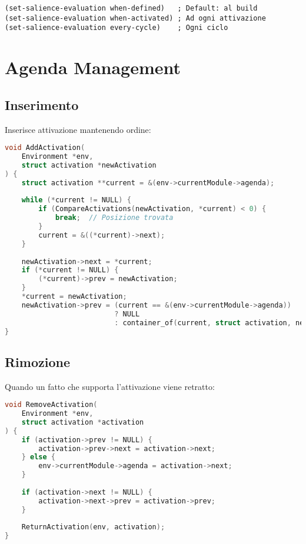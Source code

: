 \begin{lstlisting}[language=CLIPS]
(set-salience-evaluation when-defined)   ; Default: al build
(set-salience-evaluation when-activated) ; Ad ogni attivazione
(set-salience-evaluation every-cycle)    ; Ogni ciclo
\end{lstlisting}

\section{Agenda Management}

\subsection{Inserimento}

Inserisce attivazione mantenendo ordine:

\begin{lstlisting}[language=C]
void AddActivation(
    Environment *env,
    struct activation *newActivation
) {
    struct activation **current = &(env->currentModule->agenda);
    
    while (*current != NULL) {
        if (CompareActivations(newActivation, *current) < 0) {
            break;  // Posizione trovata
        }
        current = &((*current)->next);
    }
    
    newActivation->next = *current;
    if (*current != NULL) {
        (*current)->prev = newActivation;
    }
    *current = newActivation;
    newActivation->prev = (current == &(env->currentModule->agenda)) 
                          ? NULL 
                          : container_of(current, struct activation, next);
}
\end{lstlisting}

\subsection{Rimozione}

Quando un fatto che supporta l'attivazione viene retratto:

\begin{lstlisting}[language=C]
void RemoveActivation(
    Environment *env,
    struct activation *activation
) {
    if (activation->prev != NULL) {
        activation->prev->next = activation->next;
    } else {
        env->currentModule->agenda = activation->next;
    }
    
    if (activation->next != NULL) {
        activation->next->prev = activation->prev;
    }
    
    ReturnActivation(env, activation);
}
\end{lstlisting}

